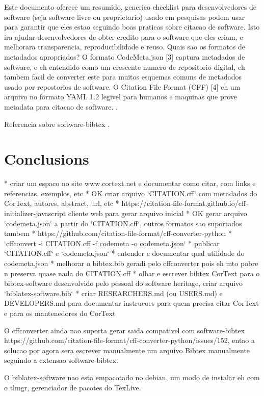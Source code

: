 \documentclass{article}
\begin{document}
Este documento oferece um resumido, generico checklist para desenvolvedores de software
(seja software livre ou proprietario) usado em pesquisas podem usar para garantir que eles
estao seguindo boas praticas sobre citacao de software. Isto ira ajudar desenvolvedores de
obter credito para o software que eles criam, e melhorara transparencia, reproducibilidade
e reuso.
Quais sao os formatos de metadados apropriados?
O formato CodeMeta.json [3]  captura metadados de software, e eh entendido como um crescente
numero de repositorio digital, eh tambem facil de converter este para muitos esquemas
comuns de metadados usado por repostorios de software.
O Citation File Format (CFF) [4] eh um arquivo no formato YAML 1.2 legivel para humanos e
maquinas que prove metadata para citacao de software.
\cite{chue_hong_software_2019}.

Referencia sobre software-bibtex \cite{softwareheritageorg_citing_2020}.

\section{Conclusions}

* criar um espaco no site www.cortext.net e documentar como citar, com links e referencias, exemplos, etc
* OK criar arquivo `CITATION.cff` com metadados do CorText, autores, abstract, url, etc
  * https://citation-file-format.github.io/cff-initializer-javascript cliente web para gerar arquivo inicial
* OK gerar arquivo `codemeta.json` a partir do `CITATION.cff`, outros formatos sao suportados tambem
  * https://github.com/citation-file-format/cff-converter-python
  * `cffconvert -i CITATION.cff -f codemeta -o codemeta.json`
* publicar `CITATION.cff` e `codemeta.json`
* entender e documentar qual utilidade do codemeta.json
* melhorar o bibtex.bib geradi pelo cffconverter pois eh mto pobre n preserva quase nada do CITATION.cff
* olhar e escrever bibtex CorText para o bibtex-software desenvolvido pelo pessoal do software heritage, criar arquivo `biblatex-software.bib`
* criar RESEARCHERS.md (ou USERS.md) e DEVELOPERS.md para documentar instrucoes para quem precisa citar CorText e para os mantenedores do CorText

O cffconverter ainda nao suporta gerar saida compativel com software-bibtex https://github.com/citation-file-format/cff-converter-python/issues/152,
entao a solucao por agora sera escrever manualmente um arquivo Bibtex manualmente seguindo a extensao software-bibtex.

O biblatex-software nao esta empacotado no debian, um modo de instalar eh com o tlmgr, gerenciador
de pacotes do TexLive.
\end{document}
